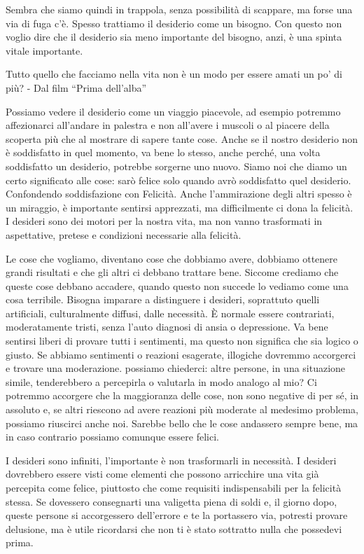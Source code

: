 \documentclass[12pt]{book} %
\begin{document}
Sembra che siamo quindi in trappola, senza possibilità di scappare, ma forse una via di fuga c'è.
Spesso trattiamo il desiderio come un bisogno. Con questo non voglio dire che il desiderio sia meno importante del
bisogno, anzi, è una spinta vitale importante.

Tutto quello che facciamo nella vita non è un modo per essere amati un po' di più? - Dal film “Prima dell'alba”

Possiamo vedere il desiderio come un viaggio piacevole, ad esempio potremmo affezionarci all'andare in palestra e non all'avere i muscoli o al piacere della scoperta più che al mostrare di sapere tante cose. Anche se il nostro desiderio non è soddisfatto in quel momento, va bene lo stesso, anche perché, una volta soddisfatto un desiderio, potrebbe sorgerne uno nuovo. Siamo noi che diamo un certo significato alle cose: sarò felice solo quando avrò soddisfatto quel desiderio. Confondendo soddisfazione con Felicità. Anche l'ammirazione degli altri spesso è un miraggio, è importante sentirsi apprezzati, ma difficilmente ci dona la felicità. I desideri sono dei motori per la nostra vita, ma non vanno
trasformati in aspettative, pretese e condizioni necessarie alla felicità.

Le cose che vogliamo, diventano cose che dobbiamo avere, dobbiamo ottenere grandi risultati e che gli altri ci debbano
trattare bene. Siccome crediamo che queste cose debbano accadere, quando questo non succede lo vediamo come una cosa
terribile. Bisogna imparare a distinguere i desideri, soprattuto quelli artificiali, culturalmente diffusi, dalle necessità. È
normale essere contrariati, moderatamente tristi, senza l'auto diagnosi di ansia o depressione.
Va bene sentirsi liberi di provare tutti i sentimenti, ma questo non significa che sia logico o giusto.
Se abbiamo sentimenti o reazioni esagerate, illogiche dovremmo accorgerci e trovare una moderazione.  
possiamo chiederci: altre persone, in una situazione simile, tenderebbero a percepirla o valutarla in modo analogo al mio? Ci potremmo accorgere che la maggioranza delle cose, non sono negative di per sé, in assoluto e, se altri riescono ad avere reazioni più moderate al medesimo problema, possiamo riuscirci anche noi. 
Sarebbe bello che le cose andassero sempre bene, ma in caso contrario possiamo comunque essere felici.

I desideri sono infiniti, l'importante è non trasformarli in necessità. I desideri dovrebbero essere visti come elementi che possono arricchire una vita già percepita come felice, piuttosto che come requisiti indispensabili per la felicità stessa. Se
dovessero consegnarti una valigetta piena di soldi e, il giorno dopo, queste persone si accorgessero dell'errore e
te la portassero via, potresti provare delusione, ma è utile ricordarsi che non ti è stato sottratto nulla che possedevi prima. 
\end{document}

